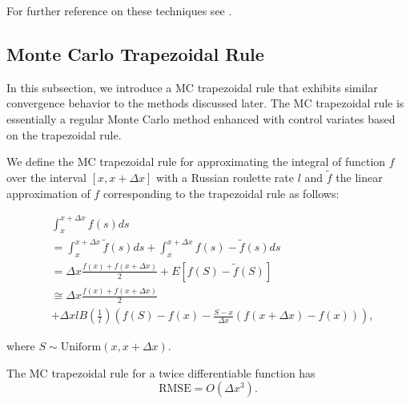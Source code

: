 \documentclass[a4paper,12pt]{article}
\begin{document}
\begin{related}[MC modification]
    For further reference on these techniques see \cite{veach_robust_1997}.
\end{related}

\subsection{Monte Carlo Trapezoidal Rule}

In this subsection, we introduce a MC trapezoidal rule that
exhibits similar convergence behavior to the methods discussed later.
The MC trapezoidal rule is essentially a regular Monte Carlo method
enhanced with control variates based on the trapezoidal rule.

\begin{definition}
    We define the MC trapezoidal rule for approximating the integral
    of function $f$ over the interval $[x, x+\Delta x]$ with a Russian roulette rate
    $l$ and $\tilde{f}$ the linear approximation of $f$ corresponding
    to the trapezoidal rule as follows:

    \begin{align}
         & \int_{x}^{x+\Delta x} f(s) ds                           \\
         & = \int_{x}^{x+\Delta x}  \tilde{f}(s) ds +
        \int_{x}^{x+\Delta x}  f(s) - \tilde{f}(s) ds              \\
         & = \Delta x \frac{f(x) + f(x+\Delta x)}{2}
        + E \left[f(S) - \tilde{f}(S)\right]                       \\
         & \cong \Delta x \frac{f(x) + f(x+\Delta x)}{2} \nonumber \\
         & + \Delta x l B\left( \frac{1}{l}\right)
        \left(f(S) - f(x) - \frac{S - x}{\Delta x}
        \left(f(x+\Delta x) - f(x)\right) \right), \label{eq:MCtrap}
    \end{align}

    where $S \sim \text{Uniform}(x,x+\Delta x)$.
\end{definition}

\begin{lemma} \label{lem:rmse mctrap}
    The MC trapezoidal rule
    for a twice differentiable function has
    \begin{equation}
        \text{RMSE} =O\left( \Delta x^{3} \right) .
    \end{equation}
\end{lemma}
\end{document}

